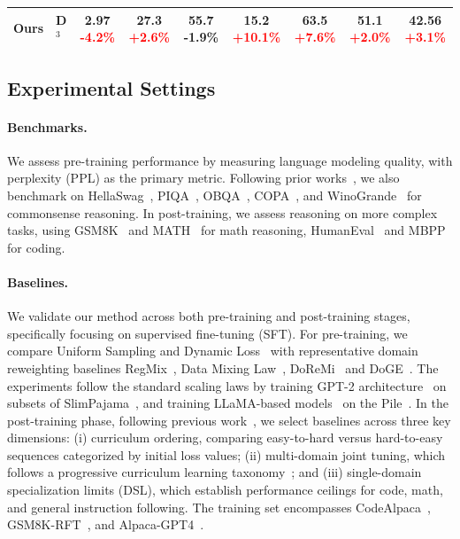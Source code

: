 \begin{table}[htbp]
{\begin{tabular}{llc ccccc c}
\rowcolor[HTML]{F3F3F3} 
\textbf{Ours} & \textbf{D$^3$} & \textbf{2.97} \scriptsize{\textcolor{red}{-4.2\%}} & \textbf{27.3} \scriptsize{\textcolor{red}{+2.6\%}} & 55.7 \scriptsize{\textcolor{green!60!black}{-1.9\%}} & \textbf{15.2} \scriptsize{\textcolor{red}{+10.1\%}} & \textbf{63.5} \scriptsize{\textcolor{red}{+7.6\%}} & \textbf{51.1} \scriptsize{\textcolor{red}{+2.0\%}} & \textbf{42.56} \scriptsize{\textcolor{red}{+3.1\%}} \\ \bottomrule
\end{tabular}
}
\end{table}
\subsection{Experimental Settings}
\paragraph{Benchmarks.}
We assess pre-training performance by measuring language modeling quality, with perplexity (PPL) as the primary metric. Following prior works~\cite{liu2024regmix,rethinking_2026}, we also benchmark on HellaSwag~\cite{zellers2019hellaswag}, PIQA~\cite{bisk2020piqa}, OBQA~\cite{mihaylov2018openbookqa}, COPA~\cite{sarlin2020copa}, and WinoGrande~\cite{sakaguchi2021winogrande} for commonsense reasoning. In post-training, we assess reasoning on more complex tasks, using GSM8K~\cite{cobbe2021gsm8k} and MATH~\cite{hendrycks2021math} for math reasoning, HumanEval~\cite{chen2021evaluatinglargelanguagemodels} and MBPP for coding.
\paragraph{Baselines.}
We validate our method across both pre-training and post-training stages, specifically focusing on supervised fine-tuning (SFT). For pre-training, we compare Uniform Sampling and Dynamic Loss~\cite{sow2025dynamic} with representative domain reweighting baselines RegMix~\cite{liu2024regmix}, Data Mixing Law~\cite{ye2024mixinglaws}, DoReMi~\cite{doremi} and DoGE~\cite{fan2023doge}. The experiments follow the standard scaling laws by training GPT-2 architecture~\cite{kaplan2020scaling} on subsets of SlimPajama~\cite{soboleva2023slimpajama}, and training LLaMA-based models~\cite{grattafiori2024llama} on the Pile~\cite{gao2021pile}. In the post-training phase, following previous work~\cite{DBLP:conf/icml/Liang00LWCH25}, we select baselines across three key dimensions: (i) curriculum ordering, comparing easy-to-hard versus hard-to-easy sequences categorized by initial loss values; (ii) multi-domain joint tuning, which follows a progressive curriculum learning taxonomy~\cite{soviany2022curriculum}; and (iii) single-domain specialization limits (DSL), which establish performance ceilings for code, math, and general instruction following.
The training set encompasses CodeAlpaca~\cite{codealpaca_2023}, GSM8K-RFT~\cite{gsm8k_2021}, and Alpaca-GPT4~\cite{alpaca_2023}. 


